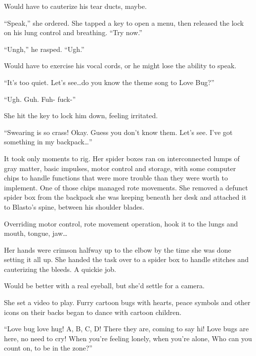 Would have to cauterize his tear ducts, maybe.



``Speak,'' she ordered.  She tapped a key to open a menu, then released the lock on his lung control and breathing.  ``Try now.''



``Ungh,'' he rasped.  ``Ugh.''



Would have to exercise his vocal cords, or he might lose the ability to speak.



``It's too quiet.  Let's see\ldots do you know the theme song to Love Bug?''



``Ugh.  Guh.  Fuh- fuck-''



She hit the key to lock him down, feeling irritated.



``Swearing is so crass!  Okay.  Guess you don't know them.  Let's see.  I've got something in my backpack\ldots''



It took only moments to rig.  Her spider boxes ran on interconnected lumps of gray matter, basic impulses, motor control and storage, with some computer chips to handle functions that were more trouble than they were worth to implement.  One of those chips managed rote movements.  She removed a defunct spider box from the backpack she was keeping beneath her desk and attached it to Blasto's spine, between his shoulder blades.



Overriding motor control, rote movement operation, hook it to the lungs and mouth, tongue, jaw\ldots



Her hands were crimson halfway up to the elbow by the time she was done setting it all up.  She handed the task over to a spider box to handle stitches and cauterizing the bleeds.  A quickie job.



Would be better with a real eyeball, but she'd settle for a camera.



She set a video to play.  Furry cartoon bugs with hearts, peace symbols and other icons on their backs began to dance with cartoon children.



``Love bug love hug!  A, B, C, D!
There they are, coming to say hi!
Love bugs are here, no need to cry!
When you're feeling lonely, when you're alone,
Who can you count on, to be in the zone?''



